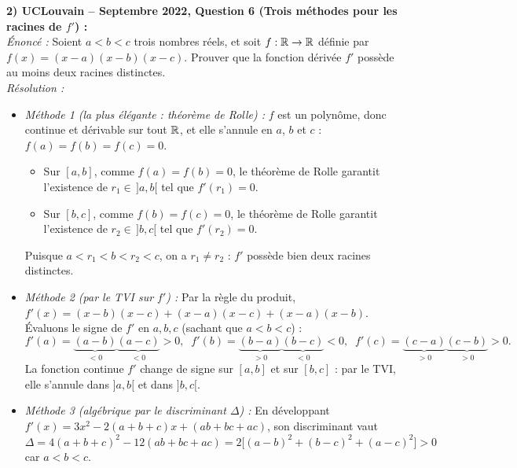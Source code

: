 \begin{exemple}
\medskip
\textbf{2) UCLouvain -- Septembre 2022, Question 6 (Trois méthodes pour les racines de $f'$) :}\\
\emph{Énoncé :} Soient $a < b < c$ trois nombres réels, et soit $f : \mathbb{R} \to \mathbb{R}$ définie par $f(x) = (x-a)(x-b)(x-c)$. Prouver que la fonction dérivée $f'$ possède au moins deux racines distinctes.\\
\emph{Résolution :}
\begin{itemize}
    \item \emph{Méthode 1 (la plus élégante : théorème de Rolle) :} $f$ est un polynôme, donc continue et dérivable sur tout $\mathbb{R}$, et elle s'annule en $a$, $b$ et $c$ : $f(a) = f(b) = f(c) = 0$.
    \begin{itemize}
        \item Sur $[a, b]$, comme $f(a) = f(b) = 0$, le théorème de Rolle garantit l'existence de $r_1 \in \,]a, b[$ tel que $f'(r_1) = 0$.
        \item Sur $[b, c]$, comme $f(b) = f(c) = 0$, le théorème de Rolle garantit l'existence de $r_2 \in \,]b, c[$ tel que $f'(r_2) = 0$.
    \end{itemize}
    Puisque $a < r_1 < b < r_2 < c$, on a $r_1 \neq r_2$ : $f'$ possède bien deux racines distinctes.
    \item \emph{Méthode 2 (par le TVI sur $f'$) :} Par la règle du produit, $f'(x) = (x-b)(x-c) + (x-a)(x-c) + (x-a)(x-b)$. Évaluons le signe de $f'$ en $a, b, c$ (sachant que $a < b < c$) :
    \[
        f'(a) = \underbrace{(a-b)}_{<0}\underbrace{(a-c)}_{<0} > 0, \;\; f'(b) = \underbrace{(b-a)}_{>0}\underbrace{(b-c)}_{<0} < 0, \;\; f'(c) = \underbrace{(c-a)}_{>0}\underbrace{(c-b)}_{>0} > 0.
    \]
    La fonction continue $f'$ change de signe sur $[a, b]$ et sur $[b, c]$ : par le TVI, elle s'annule dans $]a, b[$ et dans $]b, c[$.
    \item \emph{Méthode 3 (algébrique par le discriminant $\Delta$) :} En développant $f'(x) = 3x^2 - 2(a+b+c)x + (ab+bc+ac)$, son discriminant vaut $\Delta = 4(a+b+c)^2 - 12(ab+bc+ac) = 2\bigl[(a-b)^2 + (b-c)^2 + (a-c)^2\bigr] > 0$ car $a < b < c$.
\end{itemize}


\end{exemple}
